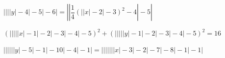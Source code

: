  $\left|\left|\left|\left|y\right|-4\right|-5\right|-6\right|=\left|\left|\dfrac{1}{4}\left(\left|\left|x\right|-2\right|-3\right)^{2}-4\right|-5\right|$

 $\left(\left|\left|\left|\left|\left|x\right|-1\right|-2\right|-3\right|-4\right|-5\right)^{2}+\left(\left|\left|\left|\left|\left|y\right|-1\right|-2\right|-3\right|-4\right|-5\right)^{2}=16$

 $\left|\left|\left|\left|\left|\left|y\right|-5\right|-1\right|-10\right|-4\right|-1\right|=\left|\left|\left|\left|\left|\left|\left|x\right|-3\right|-2\right|-7\right|-8\right|-1\right|-1\right|$